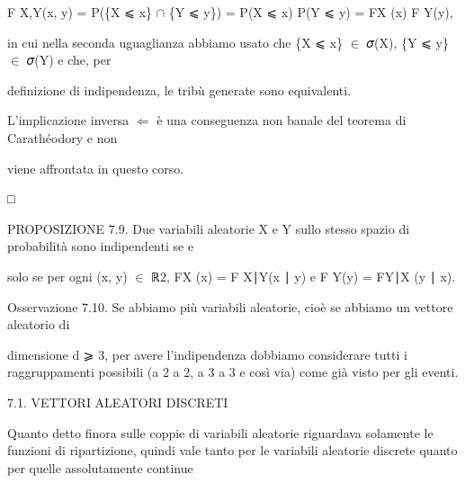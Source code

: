 \documentclass[a4paper,portrait,12pt]{article}
\begin{document}
\begin{flushleft}
F X,Y(x, y) = P(\{X ⩽ x\} $\cap$ \{Y ⩽ y\}) = P(X ⩽ x) P(Y ⩽ y) = FX (x) F Y(y),
\end{flushleft}


\begin{flushleft}
in cui nella seconda uguaglianza abbiamo usato che \{X ⩽ x\} $\in$ 𝜎(X), \{Y ⩽ y\} $\in$ 𝜎(Y) e che, per
\end{flushleft}


\begin{flushleft}
definizione di indipendenza, le tribù generate sono equivalenti.
\end{flushleft}


\begin{flushleft}
L'implicazione inversa $\Leftarrow$ \`{e} una conseguenza non banale del teorema di Carath\'{e}odory e non
\end{flushleft}


\begin{flushleft}
viene affrontata in questo corso.
\end{flushleft}


□


\begin{flushleft}
PROPOSIZIONE 7.9. Due variabili aleatorie X e Y sullo stesso spazio di probabilit\`{a} sono indipendenti se e
\end{flushleft}


\begin{flushleft}
solo se per ogni (x, y) $\in$ ℝ2, FX (x) = F X∣Y(x ∣ y) e F Y(y) = FY∣X (y ∣ x).
\end{flushleft}


\begin{flushleft}
Osservazione 7.10. Se abbiamo più variabili aleatorie, cio\`{e} se abbiamo un vettore aleatorio di
\end{flushleft}


\begin{flushleft}
dimensione d ⩾ 3, per avere l'indipendenza dobbiamo considerare tutti i raggruppamenti possibili (a 2 a 2, a 3 a 3 e così via) come gi\`{a} visto per gli eventi.
\end{flushleft}





\begin{flushleft}
7.1. VETTORI ALEATORI DISCRETI
\end{flushleft}


\begin{flushleft}
Quanto detto finora sulle coppie di variabili aleatorie riguardava solamente le funzioni di ripartizione, quindi vale tanto per le variabili aleatorie discrete quanto per quelle assolutamente continue
\end{flushleft}
\end{document}
